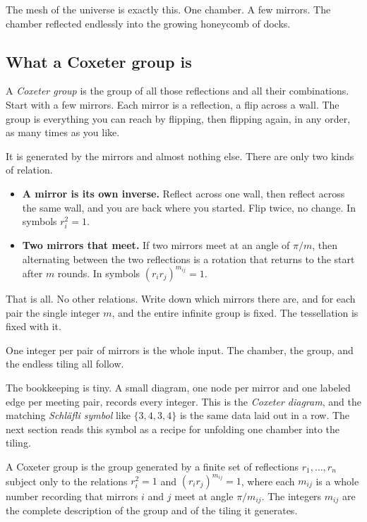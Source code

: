 The mesh of the universe is exactly this. One chamber. A few mirrors. The chamber reflected endlessly into the growing honeycomb of docks.

\subsection{What a Coxeter group is}

A \emph{Coxeter group} is the group of all those reflections and all their combinations. Start with a few mirrors. Each mirror is a reflection, a flip across a wall. The group is everything you can reach by flipping, then flipping again, in any order, as many times as you like.

It is generated by the mirrors and almost nothing else. There are only two kinds of relation.

\begin{itemize}
\item \textbf{A mirror is its own inverse.} Reflect across one wall, then reflect across the same wall, and you are back where you started. Flip twice, no change. In symbols $r_i^2 = 1$.
\item \textbf{Two mirrors that meet.} If two mirrors meet at an angle of $\pi / m$, then alternating between the two reflections is a rotation that returns to the start after $m$ rounds. In symbols $(r_i r_j)^{m_{ij}} = 1$.
\end{itemize}

That is all. No other relations. Write down which mirrors there are, and for each pair the single integer $m$, and the entire infinite group is fixed. The tessellation is fixed with it.

\begin{principle}
One integer per pair of mirrors is the whole input. The chamber, the group, and the endless tiling all follow.
\end{principle}

The bookkeeping is tiny. A small diagram, one node per mirror and one labeled edge per meeting pair, records every integer. This is the \emph{Coxeter diagram}, and the matching \emph{Schl\"afli symbol} like $\{3,4,3,4\}$ is the same data laid out in a row. The next section reads this symbol as a recipe for unfolding one chamber into the tiling.

\begin{definition}
A Coxeter group is the group generated by a finite set of reflections $r_1, \dots, r_n$ subject only to the relations $r_i^2 = 1$ and $(r_i r_j)^{m_{ij}} = 1$, where each $m_{ij}$ is a whole number recording that mirrors $i$ and $j$ meet at angle $\pi / m_{ij}$. The integers $m_{ij}$ are the complete description of the group and of the tiling it generates.
\end{definition}

